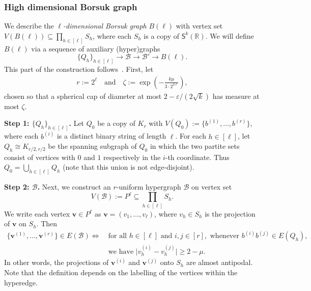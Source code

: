 \documentclass[10pt,a4paper]{article}
\newcommand{\V}[1]{\mathbold{#1}}
\theoremstyle{definition}
\def\eps{{\varepsilon}}
\newcommand{\cB}{\mathcal{B}}
\newcommand{\sS}{\mathsf{S}}
\newcommand{\sR}{\mathbb{R}}
\newcommand*{\bigabs}[1]{\bigl|#1\bigr|}
\begin{document}
\subsubsection{High dimensional Borsuk graph}\label{sec-hdB}
We describe the \emph{$\ell$-dimensional Borsuk graph} $B(\ell)$ with vertex set $V(B(\ell))\subseteq \prod_{h\in[\ell]}S_h$,
where each $S_h$ is a copy of $\sS^k(\sR)$. 
We will define $B(\ell)$ via a sequence of auxiliary (hyper)graphs 
$$\{Q_h\}_{h\in[\ell]}\longrightarrow \cB \longrightarrow \cB'\longrightarrow B(\ell).$$	
This part of the construction follows~\cite{BL-2}.
First, let
\begin{align}
r := 2^\ell\quad\text{and}\quad\zeta:=\exp\left(-\frac{k\mu}{3\cdot2^{2\ell}}\right),
\end{align} 
chosen so that a spherical cap of diameter at most $2-\eps/(2\sqrt{k})$ has measure at most $\zeta$.

\medskip
\noindent
\textbf{Step 1: $\{Q_h\}_{h \in [\ell]}$.}
Let $Q_0$ be a copy of $K_{r}$ with $V(Q_0):=\lbrace b^{(1)},\ldots,b^{(r)}\rbrace$, where each $b^{(i)}$ is a distinct binary string of length $\ell$. 
For each $h \in [\ell]$, let $Q_h\cong K_{r/2,r/2}$ be the spanning subgraph of $Q_0$ in which the two partite sets consist of vertices with $0$ and $1$ respectively in the $i$-th coordinate. %
Thus $Q_0=\bigcup_{h\in [\ell]}Q_h$ (note that this union is not edge-disjoint). 

\medskip
\noindent
\textbf{Step 2: $\cB$.}	
Next, we construct an $r$-uniform hypergraph $\cB$ on vertex set
$$
V(\cB) := P^\ell\subseteq  \prod_{h\in[\ell]}S_h.
$$
We write each vertex $\V{v}\in P^{\ell}$ as $\V{v} = (v_1,\ldots,v_\ell)$, where $v_h \in S_h$ is the projection of $\V{v}$ on $S_h$. Then  %
\begin{align}
\{\V{v}^{(1)},\ldots,\V{v}^{(r)}\} \in E(\cB) \iff~ &\text{for all }h\in [\ell] \text{ and }i,j\in [r], \text{ whenever }b^{(i)}b^{(j)}\in E(Q_h), \nonumber\\
&\text{we have }\bigabs{v^{(i)}_h - v^{(j)}_h}\ge 2-\mu. \label{def:cB}
\end{align}
In other words, the projections of $\V{v}^{(i)}$ and $\V{v}^{(j)}$ onto $S_h$ are almost antipodal. 
Note that the definition depends on the labelling of the vertices within the hyperedge.
\end{document}
